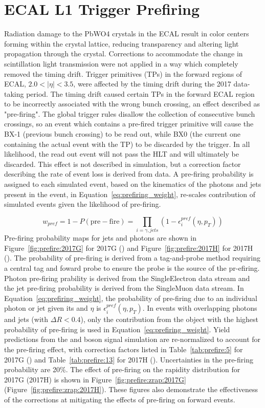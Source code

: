 \section{ECAL L1 Trigger Prefiring}\label{ch:prefire}
Radiation damage to the PbWO4 crystals in the ECAL result in color centers forming within the crystal lattice, reducing transparency and altering light propagation through the crystal. Corrections to accommodate the change in scintillation light transmission were not applied in a way which completely removed the timing drift. Trigger primitives (TPs) in the forward regions of ECAL, $2.0 < |\eta| < 3.5$, were affected by the timing drift during the 2017 data-taking period. The timing drift caused certain TPs in the forward ECAL region to be incorrectly associated with the wrong bunch crossing, an effect described as "pre-firing". The global trigger rules disallow the collection of consecutive bunch crossings, so an event which contains a pre-fired trigger primitive will cause the BX-1 (previous bunch crossing) to be read out, while BX0 (the current one containing the actual event with the TP) to be discarded by the trigger. In all likelihood, the read out event will not pass the HLT and will ultimately be discarded.
This effect is not described in simulation, but a correction factor describing the rate of event loss is derived from data. A pre-firing probability is assigned to each simulated event, based on the kinematics of the photons and jets present in the event, in Equation~\ref{eq:prefiring_weight}, re-scales contribution of simulated events given the likelihood of pre-firing.

\begin{equation}
    w_{pref} = 1 - P(\mathrm{pre-fire}) = \prod_{i=\gamma,jets}{(1 - \epsilon_i^{pref}(\eta,p_T))}
    \label{eq:prefiring_weight}
\end{equation}
Pre-firing probability maps for jets and photons are shown in Figure~\ref{fig:prefire:2017G} for 2017G (\serag) and Figure~\ref{fig:prefire:2017H} for 2017H (\serah). The probability of pre-firing is derived from a tag-and-probe method requiring a central tag and foward probe to ensure the probe is the source of the pr-efiring. Photon pre-firing prability is derived from the SingleElectron data stream and the jet pre-firing probability is derived from the SingleMuon data stream. In Equation~\ref{eq:prefiring_weight}, the probability of pre-firing due to an individual photon or jet given its \pt and $\eta$ is $\epsilon_i^{pref}(\eta,p_T)$. In events with overlapping photons and jets (with $\Delta  R < 0.4$), only the contribution from the object with the highest probability of pre-firing is used in Equation~\ref{eq:prefiring_weight}\cite{LATHOMAS}. Yield predictions from the \Wpm and \Z boson signal simulation are re-normalized to account for the pre-firing effect, with correction factors listed in Table~\ref{tab:prefire:5} for 2017G (\serag) and Table~\ref{tab:prefire:13} for 2017H (\serah). Uncertainties in the pre-firing probability are 20\%. The effect of pre-firing on the \zee rapidity distribution for 2017G (2017H) is shown in  Figure~\ref{fig:prefire:zrap:2017G} (Figure~\ref{fig:prefire:zrap:2017H}). These figures also demonstrate the effectiveness of the corrections at mitigating the effects of pre-firing on forward events.


